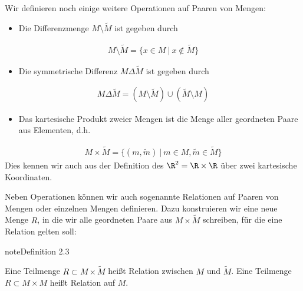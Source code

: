 \documentclass[letterpaper,10pt,english]{jupyterBook}
\begin{document}
Wir definieren noch einige weitere Operationen auf Paaren von Mengen:
\begin{itemize}
\item {} 
Die Differenzmenge \(M \setminus \tilde M\) ist gegeben durch

\end{itemize}
\begin{equation*}
\begin{split} M \setminus \tilde M = \{ x \in M ~|~ x \notin \tilde M\}
 \end{split}
\end{equation*}\begin{itemize}
\item {} 
Die symmetrische Differenz \(M \Delta \tilde M\) ist gegeben durch

\end{itemize}
\begin{equation*}
\begin{split} M \Delta \tilde M = (M \setminus \tilde M ) \cup (\tilde M \setminus M)\end{split}
\end{equation*}\begin{itemize}
\item {} 
Das kartesische Produkt zweier Mengen ist die Menge aller geordneten Paare aus Elementen, d.h.

\end{itemize}
\begin{equation*}
\begin{split} M \times \tilde M = \{ (m,\tilde m) ~|~ m \in M, \tilde m \in \tilde M\}
 \end{split}
\end{equation*}
Dies kennen wir auch aus der Definition des \(\R^2 = \R \times \R\) über zwei kartesische Koordinaten.

Neben Operationen können wir auch sogenannte Relationen auf Paaren von Mengen oder einzelnen Mengen definieren. Dazu konstruieren wir eine neue Menge \(R\), in die wir alle geordneten Paare aus \(M \times \tilde M\) schreiben, für die eine Relation gelten soll:
\label{grundlagen/mengenlogik:definition-3}
\begin{sphinxadmonition}{note}{Definition 2.3}



Eine Teilmenge \(R \subset M \times \tilde M\) heißt Relation zwischen \(M\) und \(\tilde M\). Eine Teilmenge \(R \subset M \times M\) heißt Relation auf \(M\).
\end{sphinxadmonition}
\end{document}

